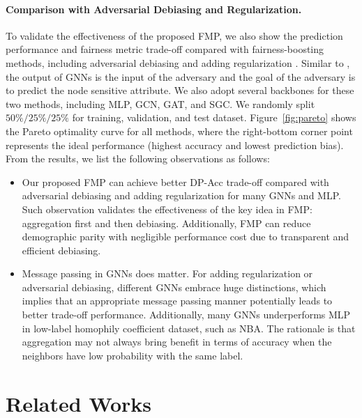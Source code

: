 \documentclass[letterpaper]{article} %
\theoremstyle{plain}
\theoremstyle{definition}
\theoremstyle{remark}
\begin{document}
\paragraph{Comparison with Adversarial Debiasing and Regularization.} To validate the effectiveness of the proposed FMP, we also show the prediction performance and fairness metric trade-off compared with fairness-boosting methods, including adversarial debiasing \citep{fisher2020debiasing} and adding regularization \citep{chuang2020fair}. Similar to \citep{louppe2017learning}, the output of GNNs is the input of the adversary and the goal of the adversary is to predict the node sensitive attribute. We also adopt several backbones for these two methods, including MLP, GCN, GAT, and SGC. We randomly split $50\%/25\%/25\%$ for training, validation, and test dataset. Figure~\ref{fig:pareto} shows the Pareto optimality curve for all methods, where the right-bottom corner point represents the ideal performance (highest accuracy and lowest prediction bias). From the results, we list the following observations as follows:
\begin{itemize}[leftmargin=0.2cm, itemindent=.0cm, itemsep=0.0cm, topsep=0.0cm]
    \item Our proposed FMP can achieve better DP-Acc trade-off compared with adversarial debiasing and adding regularization for many GNNs and MLP. Such observation validates the effectiveness of the key idea in FMP: aggregation first and then debiasing. Additionally, FMP can reduce demographic parity with negligible performance cost due to transparent and efficient debiasing.
    \item Message passing in GNNs does matter. For adding regularization or adversarial debiasing, different GNNs embrace huge distinctions, which implies that an appropriate message passing manner potentially leads to better trade-off performance. Additionally, many GNNs underperforms MLP in low-label homophily coefficient dataset, such as NBA. The rationale is that aggregation may not always bring benefit in terms of accuracy when the neighbors have low probability with the same label.
\end{itemize}

\section{Related Works} \label{sect:related}
\end{document}
